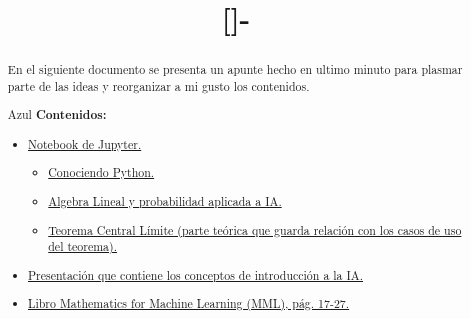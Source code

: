 \documentclass{templateApunte}
\newcounter{counter_comentario}
\newcounter{counter_observacion}
\begin{document}
\setcounter{counter_comentario}{1}
\setcounter{counter_observacion}{1}


\title{[\asignatura]-\titulo}
\author{
    \autor
}
\portada
\margenes %

\begin{abstract}
    En el siguiente documento se presenta un apunte hecho en ultimo minuto para plasmar parte de las ideas y reorganizar a mi gusto los contenidos. 
    \begin{cPB}{Azul}
      \textbf{Contenidos:}
        \begin{itemize}
            \item \hyperlink{python}{Notebook de Jupyter.}
            \begin{itemize}
              \item \hyperlink{pythonLibrerias}{Conociendo Python.}
              \item \hyperlink{algebra}{Algebra Lineal y probabilidad aplicada a IA.}
              \item \hyperlink{tcl}{Teorema Central Límite (parte teórica que guarda relación con los casos de uso del teorema).}
            \end{itemize}
            \item \hyperlink{ppt}{Presentación que contiene los conceptos de introducción a la IA.}
            \item \hyperlink{libro}{Libro Mathematics for Machine Learning (MML), pág. 17-27.}
        \end{itemize}
    \end{cPB}
\end{abstract}
\end{document}
